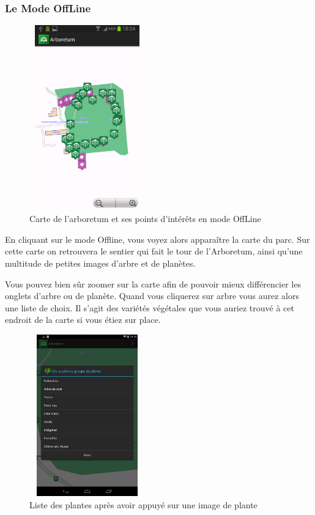 \documentclass[a4paper,11pt]{article}
\begin{document}
   \subsubsection{Le Mode OffLine}
     \begin{figure}[H]
     \begin{center}
      \includegraphics[width=5cm,height=8cm]{modeOffLine.png}
    \caption{Carte de l'arboretum et ses points d'intérêts en mode OffLine}
     \end{center}
    \end{figure}
    
    En cliquant sur le mode Offline, vous voyez alors apparaître la carte du parc. Sur cette carte on retrouvera le sentier qui fait 
    le tour de l'Arboretum, ainsi qu'une multitude de petites images d'arbre et de planètes. 
    
    Vous pouvez bien sûr zoomer sur la carte afin de pouvoir mieux différencier les onglets d'arbre ou de planète.
    Quand vous cliquerez sur arbre vous aurez alors une liste de choix. Il s'agit des variétés végétales que vous auriez trouvé à cet endroit de la carte
    si vous étiez sur place.
    
     \begin{figure}[H]
     \begin{center}
      \includegraphics[width=5cm,height=7cm]{choix.png}
    \caption{Liste des plantes après avoir appuyé sur une image de plante}
     \end{center}
    \end{figure}
    
\end{document}
